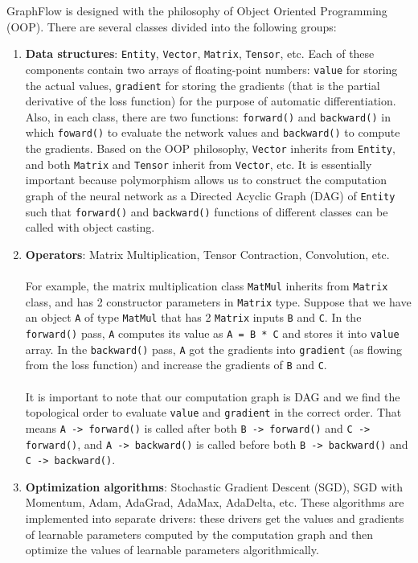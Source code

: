 \documentclass[a4paper]{article}
\begin{document}
GraphFlow is designed with the philosophy of Object Oriented Programming (OOP). There are several classes divided into the following groups:
\begin{enumerate}
	\item \textbf{Data structures}: \texttt{Entity}, \texttt{Vector}, \texttt{Matrix}, \texttt{Tensor}, etc. Each of these components contain two arrays of floating-point numbers: \texttt{value} for storing the actual values, \texttt{gradient} for storing the gradients (that is the partial derivative of the loss function) for the purpose of automatic differentiation. Also, in each class, there are two functions: \texttt{forward()} and \texttt{backward()} in which \texttt{foward()} to evaluate the network values and \texttt{backward()} to compute the gradients. Based on the OOP philosophy, \texttt{Vector} inherits from \texttt{Entity}, and both \texttt{Matrix} and \texttt{Tensor} inherit from \texttt{Vector}, etc. It is essentially important because polymorphism allows us to construct the computation graph of the neural network as a Directed Acyclic Graph (DAG) of \texttt{Entity} such that \texttt{forward()} and \texttt{backward()} functions of different classes can be called with object casting. 
	
	\item \textbf{Operators}: Matrix Multiplication, Tensor Contraction, Convolution, etc. \\ \\
	For example, the matrix multiplication class \texttt{MatMul} inherits from \texttt{Matrix} class, and has 2 constructor parameters in \texttt{Matrix} type. Suppose that we have an object \texttt{A} of type \texttt{MatMul} that has 2 \texttt{Matrix} inputs \texttt{B} and \texttt{C}. In the \texttt{forward()} pass, \texttt{A} computes its value as \texttt{A = B * C} and stores it into \texttt{value} array. In the \texttt{backward()} pass, \texttt{A} got the gradients into \texttt{gradient} (as flowing from the loss function) and increase the gradients of \texttt{B} and \texttt{C}. \\ \\
	It is important to note that our computation graph is DAG and we find the topological order to evaluate \texttt{value} and \texttt{gradient} in the correct order. That means \texttt{A -> forward()} is called after both \texttt{B -> forward()} and \texttt{C -> forward()}, and \texttt{A -> backward()} is called before both \texttt{B -> backward()} and \texttt{C -> backward()}.
	
	\item \textbf{Optimization algorithms}: Stochastic Gradient Descent (SGD), SGD with Momentum, Adam, AdaGrad, AdaMax, AdaDelta, etc. These algorithms are implemented into separate drivers: these drivers get the values and gradients of learnable parameters computed by the computation graph and then optimize the values of learnable parameters algorithmically.
	

\end{enumerate}
\end{document}
